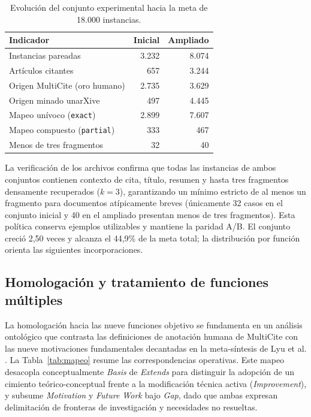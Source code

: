 \documentclass[10pt,a4paper,twocolumn]{article}
\begin{document}
\begin{table}[t]
\centering\small
\caption{Evolución del conjunto experimental hacia la meta de 18.000 instancias.}\label{tab:evolucion}
\begin{tabular}{lrr}\toprule
Indicador & Inicial & Ampliado\\\midrule
Instancias pareadas & 3.232 & 8.074\\
Artículos citantes & 657 & 3.244\\
Origen MultiCite (oro humano) & 2.735 & 3.629\\
Origen minado unarXive & 497 & 4.445\\
Mapeo unívoco (\texttt{exact}) & 2.899 & 7.607\\
Mapeo compuesto (\texttt{partial}) & 333 & 467\\
Menos de tres fragmentos & 32 & 40\\\bottomrule
\end{tabular}
\end{table}

La verificación de los archivos confirma que todas las instancias de ambos conjuntos contienen contexto de cita, título, resumen y hasta tres fragmentos densamente recuperados ($k=3$), garantizando un mínimo estricto de al menos un fragmento para documentos atípicamente breves (únicamente 32 casos en el conjunto inicial y 40 en el ampliado presentan menos de tres fragmentos). Esta política conserva ejemplos utilizables y mantiene la paridad A/B. El conjunto creció 2,50 veces y alcanza el 44,9\% de la meta total; la distribución por función orienta las siguientes incorporaciones.

\subsection{Homologación y tratamiento de funciones múltiples}
La homologación hacia las nueve funciones objetivo se fundamenta en un análisis ontológico que contrasta las definiciones de anotación humana de MultiCite \cite{Lauscher2022} con las nueve motivaciones fundamentales decantadas en la meta-síntesis de Lyu et al. \cite{Lyu2021}. La Tabla~\ref{tab:mapeo} resume las correspondencias operativas. Este mapeo desacopla conceptualmente \textit{Basis} de \textit{Extends} para distinguir la adopción de un cimiento teórico-conceptual frente a la modificación técnica activa (\textit{Improvement}), y subsume \textit{Motivation} y \textit{Future Work} bajo \textit{Gap}, dado que ambas expresan delimitación de fronteras de investigación y necesidades no resueltas.
\end{document}
